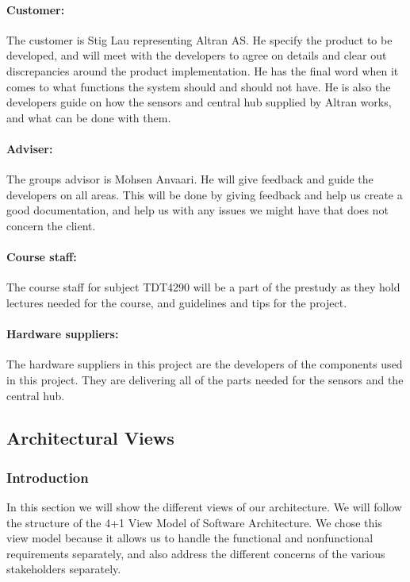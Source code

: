 \documentclass[../document.tex]{subfiles}
\begin{document}
\paragraph{Customer:} The customer is Stig Lau representing Altran AS. He specify the product to be developed, and will meet with the developers to agree on details and clear out discrepancies around the product implementation. He has the final word when it comes to what functions the system should and should not have. He is also the developers guide on how the sensors and central hub supplied by Altran works, and what can be done with them.

\paragraph{Adviser:} The groups advisor is Mohsen Anvaari. He will give feedback and guide the developers on all areas. This will be done by giving feedback and help us create a good documentation, and help us with any issues we might have that does not concern the client.

\paragraph{Course staff:} The course staff for subject TDT4290 will be a part of the prestudy as they hold lectures needed for the course, and guidelines and tips for the project. 

\paragraph{Hardware suppliers:} The hardware suppliers in this project are the developers of the components used in this project. They are delivering all of the parts needed for the sensors and the central hub.

\subsection{Architectural Views}
\subsubsection{Introduction}
In this section we will show the different views of our architecture. We will follow the structure of the 4+1 View Model of Software Architecture. We chose this view model because it allows us to handle the functional and nonfunctional requirements separately, and also address the different concerns of the various stakeholders separately. 
\end{document}
